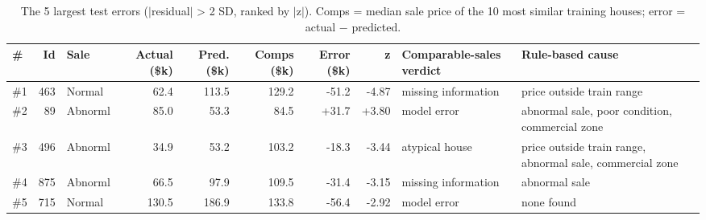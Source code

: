 \begin{table}[t]
\centering
\small
\begin{tabular}{lrlrrrrrll}
\toprule
\# & Id & Sale & Actual (\$k) & Pred. (\$k) & Comps (\$k) & Error (\$k) & z & Comparable-sales verdict & Rule-based cause \\
\midrule
\#1 & 463 & Normal & 62.4 & 113.5 & 129.2 & -51.2 & -4.87 & missing information & price outside train range \\
\#2 & 89 & Abnorml & 85.0 & 53.3 & 84.5 & +31.7 & +3.80 & model error & abnormal sale, poor condition, commercial zone \\
\#3 & 496 & Abnorml & 34.9 & 53.2 & 103.2 & -18.3 & -3.44 & atypical house & price outside train range, abnormal sale, commercial zone \\
\#4 & 875 & Abnorml & 66.5 & 97.9 & 109.5 & -31.4 & -3.15 & missing information & abnormal sale \\
\#5 & 715 & Normal & 130.5 & 186.9 & 133.8 & -56.4 & -2.92 & model error & none found \\
\bottomrule
\end{tabular}
\caption{The 5 largest test errors ($|$residual$|$ > 2 SD, ranked by $|$z$|$). Comps = median sale price of the 10 most similar training houses; error = actual $-$ predicted.}
\label{tab:error_cases}
\end{table}
